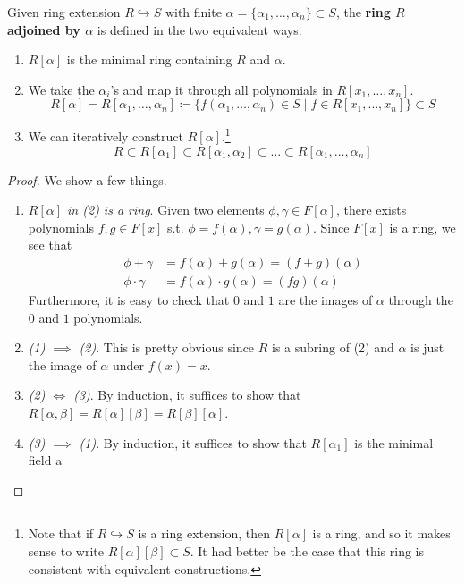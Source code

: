   \begin{definition} 
    \label{def:adjoining_ring}
    Given ring extension $R \hookrightarrow S$ with finite $\alpha = \{\alpha_1, \ldots, \alpha_n\} \subset S$, the \textbf{ring $R$ adjoined by $\alpha$} is defined in the two equivalent ways. 
    \begin{enumerate}
      \item $R[\alpha]$ is the minimal ring containing $R$ and $\alpha$. 

      \item We take the $\alpha_i$'s and map it through all polynomials in $R[x_1, \ldots, x_n]$. 
      \begin{equation}
        R[\alpha] = R[\alpha_1, \ldots, \alpha_n] \coloneqq \{ f(\alpha_1, \ldots, \alpha_n) \in S \mid f \in R[x_1, \ldots, x_n]\} \subset S
      \end{equation} 

      \item We can iteratively construct $R[\alpha]$.\footnote{Note that if $R \hookrightarrow S$ is a ring extension, then $R[\alpha]$ is a ring, and so it makes sense to write $R[\alpha][\beta] \subset S$. It had better be the case that this ring is consistent with equivalent constructions.} 
      \begin{equation}
        R \subset R[\alpha_1] \subset R[\alpha_1, \alpha_2] \subset \ldots \subset R[\alpha_1, \ldots, \alpha_n] 
      \end{equation}
    \end{enumerate}
  \end{definition} 
  \begin{proof}
    We show a few things. 
    \begin{enumerate}
      \item \textit{$R[\alpha]$ in (2) is a ring}. Given two elements $\phi, \gamma \in F[\alpha]$, there exists polynomials $f, g \in F[x]$ s.t. $\phi = f(\alpha), \gamma = g(\alpha)$. Since $F[x]$ is a ring, we see that 
      \begin{align}
        \phi + \gamma & = f(\alpha) + g(\alpha) = (f + g)(\alpha) \\
        \phi \cdot \gamma & = f(\alpha) \cdot g(\alpha) = (fg)(\alpha)
      \end{align} 
      Furthermore, it is easy to check that $0$ and $1$ are the images of $\alpha$ through the $0$ and $1$ polynomials. 
      \item \textit{(1) $\implies$ (2)}. This is pretty obvious since $R$ is a subring of (2) and $\alpha$ is just the image of $\alpha$ under $f(x) = x$. 
      \item \textit{(2) $\iff$ (3)}. By induction, it suffices to show that $R[\alpha, \beta] = R[\alpha][\beta] = R[\beta][\alpha]$. 
      \item \textit{(3) $\implies$ (1)}. By induction, it suffices to show that $R[\alpha_1]$ is the minimal field a
    \end{enumerate}
  \end{proof} 

